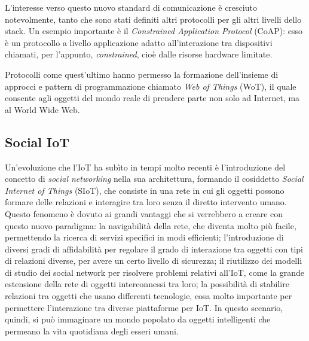 L'interesse verso questo nuovo standard di comunicazione è cresciuto notevolmente, tanto che sono stati definiti altri protocolli per gli altri livelli dello stack. Un esempio importante è il \textit{Constrained Application Protocol} (CoAP): esso è un protocollo a livello applicazione adatto all’interazione tra dispositivi chiamati, per l'appunto, \textit{constrained}, cioè dalle risorse hardware limitate.

Protocolli come quest'ultimo hanno permesso la formazione dell'insieme di approcci e pattern di programmazione chiamato \textit{Web of Things} (WoT), il quale consente agli oggetti del mondo reale di prendere parte non solo ad Internet, ma al World Wide Web.


\subsection{Social IoT}
\label{c:tec:siot}
Un'evoluzione che l'IoT ha sub\`ito in tempi molto recenti è l'introduzione del concetto di \textit{social networking} nella sua architettura, formando il cosiddetto \textit{Social Internet of Things} (SIoT), che consiste in una rete in cui gli oggetti possono formare delle relazioni e interagire tra loro senza il diretto intervento umano. Questo fenomeno è dovuto ai grandi vantaggi che si verrebbero a creare con questo nuovo paradigma: la navigabilità della rete, che diventa molto più facile, permettendo la ricerca di servizi specifici in modi efficienti; l'introduzione di diversi gradi di affidabilità per regolare il grado di interazione tra oggetti con tipi di relazioni diverse, per avere un certo livello di sicurezza; il riutilizzo dei modelli di studio dei social network per risolvere problemi relativi all'IoT, come la grande estensione della rete di oggetti interconnessi tra loro; la possibilità di stabilire relazioni tra oggetti che usano differenti tecnologie, cosa molto importante per permettere l'interazione tra diverse piattaforme per IoT. In questo scenario, quindi, si può immaginare un mondo popolato da oggetti intelligenti che permeano la vita quotidiana degli esseri umani.

